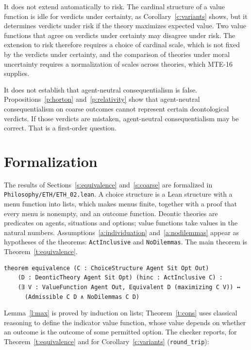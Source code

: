 \documentclass{situationist-preprint}
\begin{document}
It does not extend automatically to risk. The cardinal structure of a value function is idle for verdicts under certainty, as Corollary~\ref{c:variants} shows, but it determines verdicts under risk if the theory maximizes expected value. Two value functions that agree on verdicts under certainty may disagree under risk. The extension to risk therefore requires a choice of cardinal scale, which is not fixed by the verdicts under certainty, and the comparison of theories under moral uncertainty requires a normalization of scales across theories, which MTE-16 supplies.

It does not establish that agent-neutral consequentialism is false. Propositions~\ref{p:horton} and~\ref{p:relativity} show that agent-neutral consequentialism on coarse outcomes cannot represent certain deontological verdicts. If those verdicts are mistaken, agent-neutral consequentialism may be correct. That is a first-order question.

\section{Formalization}\label{s:formal}

The results of Sections~\ref{s:equivalence} and~\ref{s:coarse} are formalized in \nolinkurl{Philosophy/ETH/ETH_02.lean}. A choice structure is a Lean structure with a menu function into lists, which makes menus finite, together with a proof that every menu is nonempty, and an outcome function. Deontic theories are predicates on agents, situations and options; value functions take values in the natural numbers. Assumptions~\ref{a:individuation} and~\ref{a:nodilemmas} appear as hypotheses of the theorems: \texttt{ActInclusive} and \texttt{NoDilemmas}. The main theorem is Theorem~\ref{t:equivalence}.

\begin{lstlisting}
theorem equivalence (C : ChoiceStructure Agent Sit Opt Out)
    (D : DeonticTheory Agent Sit Opt) (hinc : ActInclusive C) :
    (∃ V : ValueFunction Agent Out, Equivalent D (maximizing C V)) ↔
      (Admissible C D ∧ NoDilemmas C D)
\end{lstlisting}

Lemma~\ref{l:max} is proved by induction on lists; Theorem~\ref{t:cons} uses classical reasoning to define the indicator value function, whose value depends on whether an outcome is the outcome of some permitted option. The checker reports, for Theorem~\ref{t:equivalence} and for Corollary~\ref{c:variants} (\texttt{round\_trip}):
\end{document}
